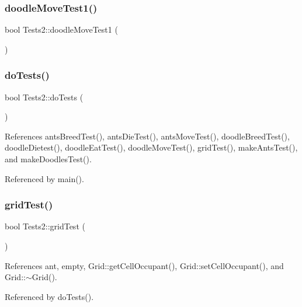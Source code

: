 \mbox{\label{classTests2_a836becfa6b79d5f2113940a11a3ef47e}} 
\subsubsection{doodle\+Move\+Test1()}
{\footnotesize\ttfamily bool Tests2\+::doodle\+Move\+Test1 (\begin{DoxyParamCaption}{ }\end{DoxyParamCaption})}

\mbox{\label{classTests2_a7392382310966597d685c8aa3a4a2f88}} 
\subsubsection{do\+Tests()}
{\footnotesize\ttfamily bool Tests2\+::do\+Tests (\begin{DoxyParamCaption}{ }\end{DoxyParamCaption})}



References ants\+Breed\+Test(), ants\+Die\+Test(), ants\+Move\+Test(), doodle\+Breed\+Test(), doodle\+Dietest(), doodle\+Eat\+Test(), doodle\+Move\+Test(), grid\+Test(), make\+Ants\+Test(), and make\+Doodles\+Test().



Referenced by main().

\mbox{\label{classTests2_afe90de3a79c4105e63205cb8f019bbb2}} 
\subsubsection{grid\+Test()}
{\footnotesize\ttfamily bool Tests2\+::grid\+Test (\begin{DoxyParamCaption}{ }\end{DoxyParamCaption})}



References ant, empty, Grid\+::get\+Cell\+Occupant(), Grid\+::set\+Cell\+Occupant(), and Grid\+::$\sim$\+Grid().



Referenced by do\+Tests().

\mbox{\label{classTests2_aa4d40396194cf770aa82dc11b449ea62}} 
